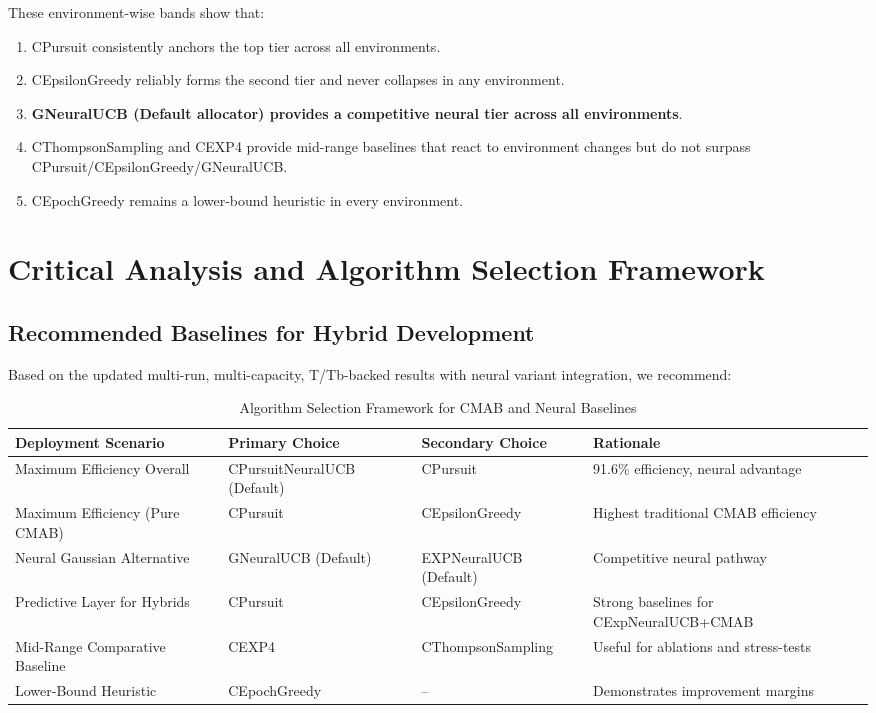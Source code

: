 \documentclass[12pt,a4paper]{article}
\newcommand{\neural}[1]{\textcolor{neuralcolor}{\textbf{#1}}}
\begin{document}
These environment-wise bands show that:

\begin{enumerate}
\item CPursuit consistently anchors the top tier across all environments.
\item CEpsilonGreedy reliably forms the second tier and never collapses in any environment.
\item \neural{GNeuralUCB (Default allocator) provides a competitive neural tier across all environments}.
\item CThompsonSampling and CEXP4 provide mid-range baselines that react to environment changes but do not surpass CPursuit/CEpsilonGreedy/GNeuralUCB.
\item CEpochGreedy remains a lower-bound heuristic in every environment.
\end{enumerate}

\newpage
\section{Critical Analysis and Algorithm Selection Framework}

\subsection{Recommended Baselines for Hybrid Development}

Based on the updated multi-run, multi-capacity, T/Tb-backed results with neural variant integration, we recommend:

\begin{table}[H]
\scriptsize
\centering
\caption{Algorithm Selection Framework for CMAB and Neural Baselines}
\begin{tabular}{|l|l|l|l|}
\hline
\textbf{Deployment Scenario} & \textbf{Primary Choice} & \textbf{Secondary Choice} & \textbf{Rationale} \\
\hline
\hline
Maximum Efficiency Overall & CPursuitNeuralUCB (Default) & CPursuit & 91.6\% efficiency, neural advantage \\
Maximum Efficiency (Pure CMAB) & CPursuit & CEpsilonGreedy & Highest traditional CMAB efficiency \\
Neural Gaussian Alternative & GNeuralUCB (Default) & EXPNeuralUCB (Default) & Competitive neural pathway \\
Predictive Layer for Hybrids & CPursuit & CEpsilonGreedy & Strong baselines for CExpNeuralUCB+CMAB \\
Mid-Range Comparative Baseline & CEXP4 & CThompsonSampling & Useful for ablations and stress-tests \\
Lower-Bound Heuristic & CEpochGreedy & -- & Demonstrates improvement margins \\
\hline
\end{tabular}
\end{table}
\end{document}

